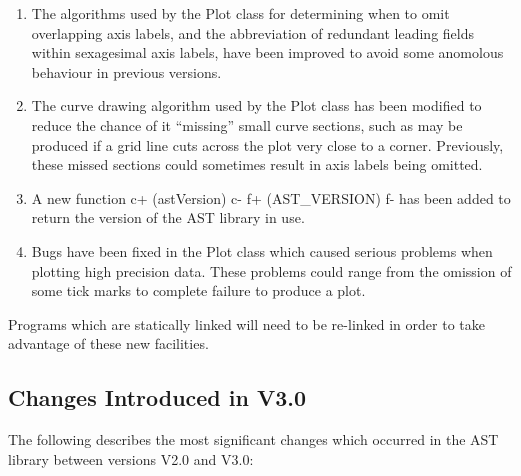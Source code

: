 \documentclass[twoside,11pt]{article}
\begin{document}
\begin{enumerate}
\item The algorithms used by the Plot class for determining when to omit
overlapping axis labels, and the abbreviation of redundant leading fields 
within sexagesimal axis labels, have been improved to avoid some anomolous
behaviour in previous versions.

\item The curve drawing algorithm used by the Plot class has been
modified to reduce the chance of it ``missing'' small curve sections,
such as may be produced if a grid line cuts across the plot very close to
a corner. Previously, these missed sections could sometimes result in 
axis labels being omitted.

\item A new function
c+
(astVersion)
c-
f+
(AST\_VERSION)
f-
has been added to return the version of the AST library in use.

\item Bugs have been fixed in the Plot class which caused serious problems
when plotting high precision data. These problems could range from the
omission of some tick marks to complete failure to produce a plot.

\end{enumerate}

Programs which are statically linked will need to be re-linked in
order to take advantage of these new facilities.


\subsection{Changes Introduced in V3.0}

The following describes the most significant changes which 
occurred in the AST library between versions V2.0 and V3.0:
\end{document}
